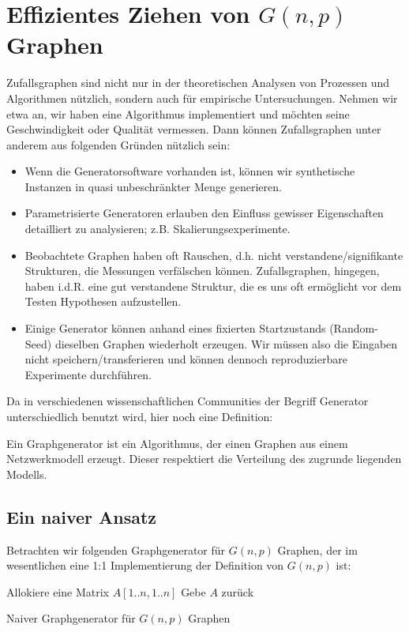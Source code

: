 \section{Effizientes Ziehen von $G(n, p)$ Graphen}
Zufallsgraphen sind nicht nur in der theoretischen Analysen von Prozessen und Algorithmen nützlich, sondern auch für empirische Untersuchungen.
Nehmen wir etwa an, wir haben eine Algorithmus implementiert und möchten seine Geschwindigkeit oder Qualität vermessen.
Dann können Zufallsgraphen unter anderem aus folgenden Gründen nützlich sein:
\begin{itemize}
    \item Wenn die Generatorsoftware vorhanden ist, können wir synthetische Instanzen in quasi unbeschränkter Menge generieren.
    \item Parametrisierte Generatoren erlauben den Einfluss gewisser Eigenschaften detailliert zu analysieren; z.B. Skalierungsexperimente.
    \item Beobachtete Graphen haben oft \glqq Rauschen\grqq, d.h. nicht verstandene/signifikante Strukturen, die Messungen verfälschen können.
          Zufallsgraphen, hingegen, haben i.d.R. eine gut verstandene Struktur, die es uns oft ermöglicht vor dem Testen Hypothesen aufzustellen.
    \item Einige Generator können anhand eines fixierten Startzustands (Random-Seed) dieselben Graphen wiederholt erzeugen.
          Wir müssen also die Eingaben nicht speichern/transferieren und können dennoch reproduzierbare Experimente durchführen.
\end{itemize}

\noindent Da in verschiedenen wissenschaftlichen Communities der Begriff \glqq Generator\grqq{} unterschiedlich benutzt wird, hier noch eine Definition:
\begin{definition}
    Ein  Graphgenerator ist ein Algorithmus, der einen Graphen aus einem Netzwerkmodell erzeugt.
    Dieser respektiert die Verteilung des zugrunde liegenden Modells.
\end{definition}

\subsection{Ein naiver Ansatz}
Betrachten wir folgenden Graphgenerator für $G(n,p)$ Graphen, der im wesentlichen eine 1:1 Implementierung der Definition von $G(n, p)$ ist:
\begin{algorithm}[h]
    Allokiere eine Matrix $A[1..n, 1..n]$\;
    Gebe $A$ zurück
    \caption{Naiver Graphgenerator für $G(n, p)$ Graphen}
    \label{alg:naive-gnp}
\end{algorithm}

